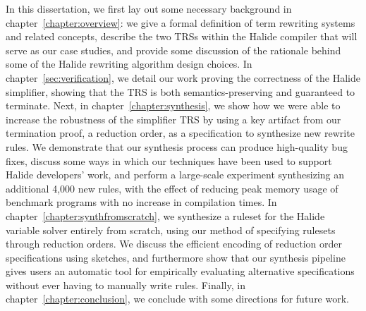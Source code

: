 In this dissertation, we first lay out some necessary background in chapter~\ref{chapter:overview}: we give a formal definition of term rewriting systems and related concepts, describe the two TRSs within the Halide compiler that will serve as our case studies, and provide some discussion of the rationale behind some of the Halide rewriting algorithm design choices. In chapter~\ref{sec:verification}, we detail our work proving the correctness of the Halide simplifier, showing that the TRS is both semantics-preserving and guaranteed to terminate. Next, in chapter~\ref{chapter:synthesis}, we show how we were able to increase the robustness of the simplifier TRS by using a key artifact from our termination proof, a reduction order, as a specification to synthesize new rewrite rules. We demonstrate that our synthesis process can produce high-quality bug fixes, discuss some ways in which our techniques have been used to support Halide developers' work, and perform a large-scale experiment synthesizing an additional 4,000 new rules, with the effect of reducing peak memory usage of benchmark programs with no increase in compilation times. In chapter~\ref{chapter:synthfromscratch}, we synthesize a ruleset for the Halide variable solver entirely from scratch, using our method of specifying rulesets through reduction orders. We discuss the efficient encoding of reduction order specifications using sketches, and furthermore show that our synthesis pipeline gives users an automatic tool for empirically evaluating alternative specifications without ever having to manually write rules. Finally, in chapter~\ref{chapter:conclusion}, we conclude with some directions for future work.
